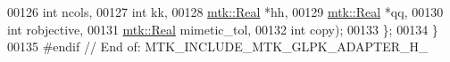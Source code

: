 \begin{DoxyCode}
00126                                           \textcolor{keywordtype}{int} ncols,
00127                                           \textcolor{keywordtype}{int} kk,
00128                                           \hyperlink{group__c01-roots_gac080bbbf5cbb5502c9f00405f894857d}{mtk::Real} *hh,
00129                                           \hyperlink{group__c01-roots_gac080bbbf5cbb5502c9f00405f894857d}{mtk::Real} *qq,
00130                                           \textcolor{keywordtype}{int} robjective,
00131                                           \hyperlink{group__c01-roots_gac080bbbf5cbb5502c9f00405f894857d}{mtk::Real} mimetic\_tol,
00132                                           \textcolor{keywordtype}{int} copy);
00133 \};
00134 \}
00135 \textcolor{preprocessor}{#endif  // End of: MTK\_INCLUDE\_MTK\_GLPK\_ADAPTER\_H\_}
\end{DoxyCode}
